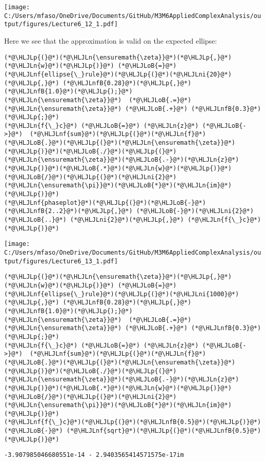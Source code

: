 \documentclass[12pt,a4paper]{article}
\newcommand{\HLJLn}[1]{#1}
\newcommand{\HLJLnf}[1]{\textcolor[RGB]{66,102,213}{#1}}
\newcommand{\HLJLnfB}[1]{\textcolor[RGB]{59,151,46}{#1}}
\newcommand{\HLJLni}[1]{\textcolor[RGB]{59,151,46}{#1}}
\newcommand{\HLJLoB}[1]{\textcolor[RGB]{102,102,102}{\textbf{#1}}}
\newcommand{\HLJLp}[1]{#1}
\begin{document}
\texttt{[image: C:/Users/mfaso/OneDrive/Documents/GitHub/M3M6AppliedComplexAnalysis/output/figures/Lecture6\_12\_1.pdf]}

Here we see that the approximation is valid on the expected ellipse:


\begin{lstlisting}
(*@\HLJLp{(}@*)(*@\HLJLn{\ensuremath{\zeta}}@*)(*@\HLJLp{,}@*) (*@\HLJLn{w}@*)(*@\HLJLp{)}@*) (*@\HLJLoB{=}@*) (*@\HLJLnf{ellipse{\_}rule}@*)(*@\HLJLp{(}@*)(*@\HLJLni{20}@*)(*@\HLJLp{,}@*) (*@\HLJLnfB{0.28}@*)(*@\HLJLp{,}@*) (*@\HLJLnfB{1.0}@*)(*@\HLJLp{);}@*)
(*@\HLJLn{\ensuremath{\zeta}}@*)  (*@\HLJLoB{.=}@*) (*@\HLJLn{\ensuremath{\zeta}}@*) (*@\HLJLoB{.+}@*) (*@\HLJLnfB{0.3}@*)(*@\HLJLp{;}@*)
(*@\HLJLn{f{\_}c}@*) (*@\HLJLoB{=}@*) (*@\HLJLn{z}@*) (*@\HLJLoB{->}@*)  (*@\HLJLnf{sum}@*)(*@\HLJLp{(}@*)(*@\HLJLn{f}@*)(*@\HLJLoB{.}@*)(*@\HLJLp{(}@*)(*@\HLJLn{\ensuremath{\zeta}}@*)(*@\HLJLp{)}@*)(*@\HLJLoB{./}@*)(*@\HLJLp{(}@*)(*@\HLJLn{\ensuremath{\zeta}}@*)(*@\HLJLoB{.-}@*)(*@\HLJLn{z}@*)(*@\HLJLp{)}@*)(*@\HLJLoB{.*}@*)(*@\HLJLn{w}@*)(*@\HLJLp{)}@*)(*@\HLJLoB{/}@*)(*@\HLJLp{(}@*)(*@\HLJLni{2}@*)(*@\HLJLn{\ensuremath{\pi}}@*)(*@\HLJLoB{*}@*)(*@\HLJLn{im}@*)(*@\HLJLp{)}@*)
(*@\HLJLnf{phaseplot}@*)(*@\HLJLp{(}@*)(*@\HLJLoB{-}@*)(*@\HLJLnfB{2..2}@*)(*@\HLJLp{,}@*) (*@\HLJLoB{-}@*)(*@\HLJLni{2}@*) (*@\HLJLoB{..}@*) (*@\HLJLni{2}@*)(*@\HLJLp{,}@*) (*@\HLJLn{f{\_}c}@*)(*@\HLJLp{)}@*)
\end{lstlisting}

\texttt{[image: C:/Users/mfaso/OneDrive/Documents/GitHub/M3M6AppliedComplexAnalysis/output/figures/Lecture6\_13\_1.pdf]}

\begin{lstlisting}
(*@\HLJLp{(}@*)(*@\HLJLn{\ensuremath{\zeta}}@*)(*@\HLJLp{,}@*) (*@\HLJLn{w}@*)(*@\HLJLp{)}@*) (*@\HLJLoB{=}@*) (*@\HLJLnf{ellipse{\_}rule}@*)(*@\HLJLp{(}@*)(*@\HLJLni{1000}@*)(*@\HLJLp{,}@*) (*@\HLJLnfB{0.28}@*)(*@\HLJLp{,}@*) (*@\HLJLnfB{1.0}@*)(*@\HLJLp{);}@*)
(*@\HLJLn{\ensuremath{\zeta}}@*)  (*@\HLJLoB{.=}@*) (*@\HLJLn{\ensuremath{\zeta}}@*) (*@\HLJLoB{.+}@*) (*@\HLJLnfB{0.3}@*)(*@\HLJLp{;}@*)
(*@\HLJLn{f{\_}c}@*) (*@\HLJLoB{=}@*) (*@\HLJLn{z}@*) (*@\HLJLoB{->}@*)  (*@\HLJLnf{sum}@*)(*@\HLJLp{(}@*)(*@\HLJLn{f}@*)(*@\HLJLoB{.}@*)(*@\HLJLp{(}@*)(*@\HLJLn{\ensuremath{\zeta}}@*)(*@\HLJLp{)}@*)(*@\HLJLoB{./}@*)(*@\HLJLp{(}@*)(*@\HLJLn{\ensuremath{\zeta}}@*)(*@\HLJLoB{.-}@*)(*@\HLJLn{z}@*)(*@\HLJLp{)}@*)(*@\HLJLoB{.*}@*)(*@\HLJLn{w}@*)(*@\HLJLp{)}@*)(*@\HLJLoB{/}@*)(*@\HLJLp{(}@*)(*@\HLJLni{2}@*)(*@\HLJLn{\ensuremath{\pi}}@*)(*@\HLJLoB{*}@*)(*@\HLJLn{im}@*)(*@\HLJLp{)}@*)
(*@\HLJLnf{f{\_}c}@*)(*@\HLJLp{(}@*)(*@\HLJLnfB{0.5}@*)(*@\HLJLp{)}@*) (*@\HLJLoB{-}@*) (*@\HLJLnf{sqrt}@*)(*@\HLJLp{(}@*)(*@\HLJLnfB{0.5}@*)(*@\HLJLp{)}@*)
\end{lstlisting}

\begin{lstlisting}
-3.907985046680551e-14 - 2.9403565414571575e-17im
\end{lstlisting}
\end{document}
